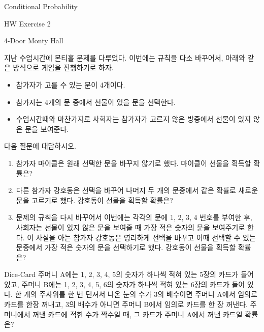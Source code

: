 \begin{edXchapter}{Conditional Probability}

\begin{edXsection}{HW Exercise 2}

\begin{edXvertical}

\begin{edXproblem}{4-Door Monty Hall}

지난 수업시간에 몬티홀 문제를 다루었다. 이번에는 규칙을 다소 바꾸어서, 아래와 같은 방식으로 게임을 진행하기로 하자.
\begin{itemize}
\item 참가자가 고를 수 있는 문이 4개이다.
\item 참가자는 4개의 문 중에서 선물이 있을 문을 선택한다.
\item 수업시간때와 마찬가지로 사회자는 참가자가 고르지 않은 방중에서 선물이 있지 않은 문을 보여준다. 
\end{itemize}
다음 질문에 대답하시오.

\begin{enumerate}
\item 참가자 마이클은 원래 선택한 문을 바꾸지 않기로 했다. 마이클이 선물을 획득할 확률은?

\item 다른 참가자 강호동은 선택을 바꾸어 나머지 두 개의 문중에서 같은 확률로 새로운 문을 고르기로 했다. 
강호동이 선물을 획득할 확률은?

\item 문제의 규칙을 다시 바꾸어서 이번에는 각각의 문에 1, 2, 3, 4 번호를 부여한 후, 
사회자는 선물이 있지 않은 문을 보여줄 때 가장 적은 숫자의 문을 보여주기로 한다. 
이 사실을 아는 참가자 강호동은 영리하게 선택을 바꾸고 이때 선택할 수 있는 문중에서 가장 적은 숫자의 문을 선택하기로 했다. 
강호동이 선물을 획득할 확률은?
\end{enumerate}
\end{edXproblem}

\begin{edXproblem}{Dice-Card}
주머니 A에는 1, 2, 3, 4, 5의 숫자가 하나씩 적혀 있는 5장의 카드가 들어 있고, 주머니 B에는 1, 2, 3, 4, 5, 6의 숫자가 
하나씩 적혀 있는 6장의 카드가 들어 있다. 한 개의 주사위를 한 번 던져서 나온 눈의 수가 3의 배수이면 주머니 A에서 임의로 
카드를 한장 꺼내고, 3의 배수가 아니면 주머니 B에서 임의로 카드를 한 장 꺼낸다. 
주머니에서 꺼낸 카드에 적힌 수가 짝수일 때, 그 카드가 주머니 A에서 꺼낸 카드일 확률은?
\end{edXproblem}


\end{edXvertical}
\end{edXsection}
\end{edXchapter}

